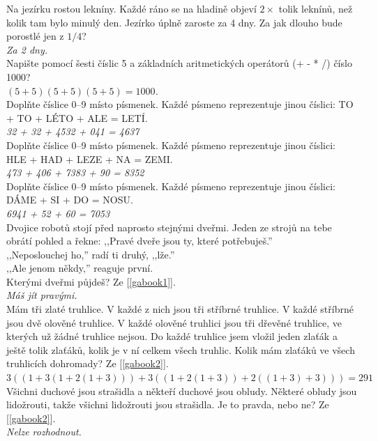 \begin{multicols}{2}
\noindent
Na jezírku rostou lekníny. Každé ráno se na hladině objeví $2\times$
tolik leknínů, než kolik tam bylo minulý den. Jezírko úplně zaroste
za 4 dny. Za jak dlouho bude porostlé jen z $1/4$?\\[1 mm]
{\sl Za 2 dny.}\\

\noindent
Napište pomocí šesti číslic 5 a základních aritmetických operátorů
(+ - * /) číslo 1000?\\[1 mm]
{\sl $(5+5)(5+5)(5+5)=1000$.}\\

\noindent
Doplňte číslice 0--9 místo písmenek. Každé písmeno reprezentuje 
jinou číslici: TO + TO + LÉTO + ALE = LETÍ.\\[1 mm]
{\sl 32 + 32 + 4532 + 041 = 4637}\\

\noindent
Doplňte číslice 0--9 místo písmenek. Každé písmeno reprezentuje 
jinou číslici: HLE + HAD + LEZE + NA = ZEMI.\\[1 mm]
{\sl 473 + 406 + 7383 + 90 = 8352}\\

\noindent
Doplňte číslice 0--9 místo písmenek. Každé písmeno reprezentuje 
jinou číslici: DÁME + SI + DO = NOSU.\\[1 mm]
{\sl 6941 + 52 + 60 = 7053}\\

\noindent
Dvojice robotů stojí před naprosto stejnými dveřmi. Jeden ze strojů na tebe
obrátí pohled a řekne: ,,Pravé dveře jsou ty, které potřebuješ.''\\
,,Neposlouchej ho,'' radí ti druhý, ,,lže.''\\
,,Ale jenom někdy,'' reaguje první.\\
Kterými dveřmi půjdeš? Ze [\ref{gabook1}].\\[1 mm]
{\sl Máš jít pravými.}\\

\noindent
Mám tři zlaté truhlice. V každé z nich jsou tři stříbrné truhlice. V každé
stříbrné jsou dvě olověné truhlice. V každé olověné truhlici jsou tři dřevěné
truhlice, ve kterých už žádné truhlice nejsou. Do každé truhlice jsem vložil
jeden zlaťák a ještě tolik zlaťáků, kolik je v ní celkem všech truhlic. Kolik
mám zlaťáků ve všech truhlicích dohromady? Ze [\ref{gabook2}].\\[1 mm]
{\sl $3((1+3(1+2(1+3)))+3((1+2(1+3))+2((1+3)+3))) = 291$}\\

\noindent
Všichni duchové jsou strašidla a někteří duchové jsou obludy. Některé obludy
jsou lidožrouti, takže všichni lidožrouti jsou strašidla. Je to pravda,
nebo ne? Ze [\ref{gabook2}].\\[1 mm]
{\sl Nelze rozhodnout.}\\


\end{multicols}
